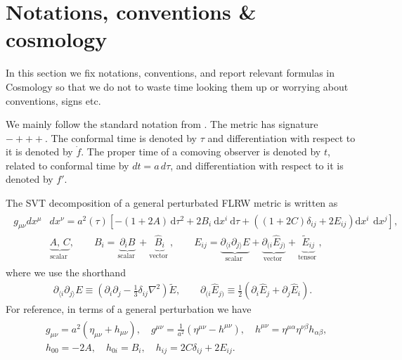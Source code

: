 \section{Notations, conventions \& cosmology}

In this section we fix notations, conventions, and report relevant formulas in Cosmology so that we do not to waste time looking them up or worrying about conventions, signs etc. 

We mainly follow the standard notation from \cite{MaBertschinger_CosmologicalPerturbationTheorySynchronousConformalNewtonianGauges_1995,Baumann_Cosmology_2022}.
The metric has signature $-+++$.
The conformal time is denoted by $\tau$ and differentiation with respect to it is denoted by $\dot{f}$.
The proper time of a comoving observer is denoted by $t$, related to conformal time by $dt=a \,d\tau$, and differentiation with respect to it is denoted by $f'$.

The SVT decomposition of a general perturbated FLRW metric is written as 
{\small\begin{align} \label{eq:metric_general_form_svt}\begin{aligned}
g_{\mu\nu}dx^\mu& dx^\nu=a^{2}(\tau)\left[-(1+2 A) \,\mathrm{d} \tau^{2}+2 B_{i} \mathrm{~d} x^{i} \mathrm{~d} \tau+\left((1+2C)\delta_{ij}+2E_{ij}\right) \mathrm{d} x^{i} \,\mathrm{~d} x^{j}\right],\\[3pt]
&\underbrace{A,\, C}_{\text {scalar }}, \qquad
B_{i}=\underbrace{\partial_{i} {B}}_{\text {scalar }}+\underbrace{\hat{B}_{i}}_{\text {vector }},\qquad E_{i j}=\underbrace{\partial_{\langle i} \partial_{j\rangle} {E}}_{\text {scalar }}+\underbrace{\partial_{(i} \hat{E}_{j)}}_{\text {vector }}+\underbrace{\tilde{E}_{i j}}_{\text {tensor }},
\end{aligned}\end{align}}
where we use the shorthand
{\small\begin{align}\label{eq:convention_svt_decomposition}
\partial_{\langle i} \partial_{j\rangle} {E} \equiv\left(\partial_{i} \partial_{j}-\frac{1}{3} \delta_{i j} \nabla^{2}\right) \tilde{E},\qquad
\partial_{(i} \hat{E}_{j)}\equiv \frac{1}{2}\left(\partial_{i} \hat{E}_{j}+\partial_{j} \hat{E}_{i}\right).
\end{align}}
For reference, in terms of a general perturbation we have
{\small\begin{align}\label{eq:general_perturbations_vs_SVT_decomposition}
\begin{aligned}
    &g_{\mu\nu}=a^2(\eta_{\mu\nu}+h_{\mu\nu}), \quad g^{\mu\nu}=\tfrac{1}{a^2}(\eta^{\mu\nu}-h^{\mu\nu}), \quad h^{\mu\nu}=\eta^{\mu\alpha}\eta^{\nu\beta}h_{\alpha\beta}, \\[3pt]
    &h_{00}=-2A, \quad h_{0i}=B_i, \quad h_{ij}=2C\delta_{ij}+2E_{ij}.
\end{aligned}\end{align}}

